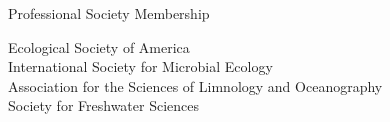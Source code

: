 \documentclass{resume} %
\begin{document}
\bigskip

\begin{rSection}{Professional Society Membership}

Ecological Society of America\\
International Society for Microbial Ecology\\
Association for the Sciences of Limnology and Oceanography\\
Society for Freshwater Sciences\\

\end{rSection}

\end{document}
